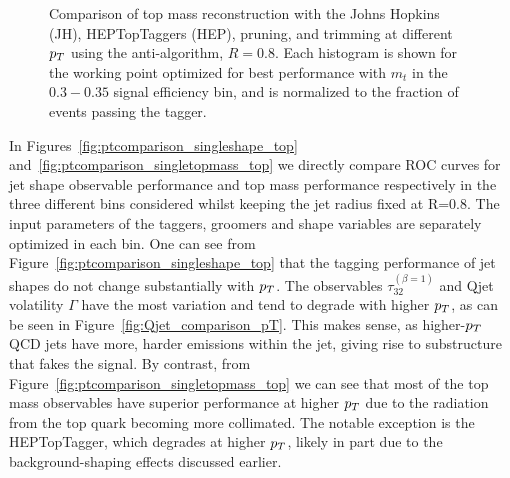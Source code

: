 \begin{figure}
\begin{center}
\caption{Comparison of top mass reconstruction with the Johns Hopkins (JH), HEPTopTaggers (HEP), pruning, and trimming at different $p_T$ using the anti-\kT algorithm, $R=0.8$. Each histogram is shown for the working point optimized for best performance with $m_t$ in the $0.3-0.35$ signal efficiency bin, and is normalized to the fraction of events passing the tagger.}
\label{fig:topmass_histogram_HEP_JH_pT}
\end{center}
\end{figure}


In Figures~\ref{fig:ptcomparison_singleshape_top} and~\ref{fig:ptcomparison_singletopmass_top} we directly compare ROC curves for jet shape observable performance and top mass performance respectively in the three different \pt bins considered whilst keeping the jet radius fixed at R=0.8. The input parameters of the taggers, groomers and shape variables are separately optimized in each \pt bin.  One can see from Figure~\ref{fig:ptcomparison_singleshape_top} that the tagging performance of jet shapes do not change substantially with $p_T$. The observables $\tau_{32}^{(\beta=1)}$ and Qjet volatility $\Gamma$ have the most variation and tend to degrade with higher $p_T$, as can be seen in Figure~\ref{fig:Qjet_comparison_pT}. This makes sense, as higher-$p_T$ QCD jets have more, harder emissions within the jet, giving rise to substructure that fakes the signal. By contrast, from Figure~\ref{fig:ptcomparison_singletopmass_top} we can see that most of the top mass observables have superior performance at higher $p_T$ due to the radiation from the top quark becoming more collimated. The notable exception is the HEPTopTagger, which degrades at higher $p_T$, likely in part due to the background-shaping effects discussed earlier.

